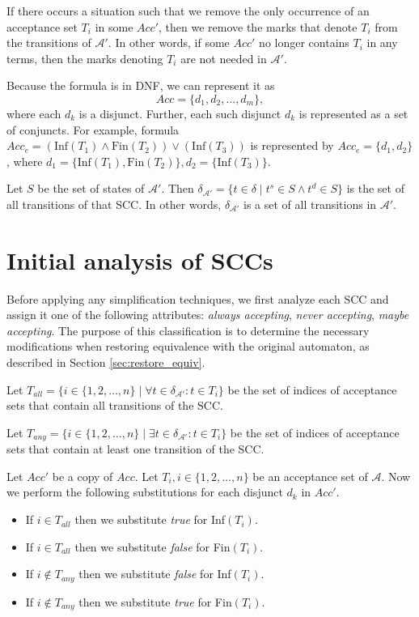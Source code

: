 \documentclass[
  digital, %
  twoside, %
  table,   %
  lof,     %
  lot,     %
]{fithesis3}
\begin{document}
If there occurs a situation such that we remove the only occurrence of an acceptance set $T_i$ in some $Acc'$, then we remove the marks that denote $T_i$ from the transitions of $\mathcal{A'}$. In other words, if some $Acc'$ no longer contains $T_i$ in any terms, then the marks denoting $T_i$ are not needed in $\mathcal{A'}$.

Because the formula is in DNF, we can represent it as 
\begin{equation*}
  Acc = \{d_1, d_2, \dots, d_m\},
\end{equation*}
where each $d_k$ is a disjunct. Further, each such disjunct $d_k$ is represented as a set of conjuncts. For example, formula $Acc_e = (\text{Inf}(T_1) \wedge \text{Fin}(T_2)) \vee (\text{Inf}(T_3))$ is represented by $Acc_e = \{d_1, d_2\}$, where $d_1 = \{\text{Inf}(T_1), \text{Fin}(T_2)\}, d_2 = \{\text{Inf}(T_3)\}$. 

Let $S$ be the set of states of $\mathcal{A'}$. Then $\delta_{\mathcal{A'}} = \{t \in \delta \mid t^s \in S \wedge t^d \in S\}$ is the set of all transitions of that SCC. In other words, $\delta_{\mathcal{A'}}$ is a set of all transitions in $\mathcal{A'}$.

\section{Initial analysis of SCCs}
\label{sec:init_analysis}
Before applying any simplification techniques, we first analyze each SCC and assign it one of the following attributes: \emph{always accepting}, \emph{never accepting}, \emph{maybe accepting}. The purpose of this classification is to determine the necessary modifications when restoring equivalence with the original automaton, as described in Section \ref{sec:restore_equiv}. 

Let $T_{all} = \{i \in \{1, 2, \dots, n\} \mid \forall t \in \delta_{\mathcal{A'}} \colon t \in T_i \}$ be the set of indices of acceptance sets that contain all transitions of the SCC.

Let $T_{any} = \{i \in \{1, 2, \dots, n\} \mid \exists t \in \delta_{\mathcal{A'}} \colon t \in T_i \}$ be the set of indices of acceptance sets that contain at least one transition of the SCC.

Let $Acc'$ be a copy of $Acc$. Let $T_i, i \in \{1, 2, \dots, n\}$ be an acceptance set of $\mathcal{A}$. Now we perform the following substitutions for each disjunct $d_k$ in $Acc'$. 
\begin{itemize}
  \item If $i \in T_{all}$ then we substitute \emph{true} for Inf$(T_i)$.
  \item If $i \in T_{all}$ then we substitute \emph{false} for Fin$(T_i)$.
  \item If $i \notin T_{any}$ then we substitute \emph{false} for Inf$(T_i)$.
  \item If $i \notin T_{any}$ then we substitute \emph{true} for Fin$(T_i)$.
\end{itemize}
\end{document}
